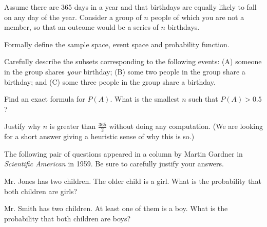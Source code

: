 \documentclass[a4paper,10pt,landscape,twocolumn]{scrartcl}
\begin{document}

\begin{exercise}[Birthdays]
  Assume there are 365 days in a year and that birthdays are equally likely to
  fall on any day of the year. Consider a group of $n$ people of which you are
  not a member, so that an outcome would be a series of $n$ birthdays.
  
  \begin{subex}
    Formally define the sample space, event space and probability function.
  \end{subex}
  
  \begin{subex}
    Carefully describe the subsets corresponding to the following events: (A)
    someone in the group shares \emph{your} birthday; (B) some two people in
    the group share a birthday; and (C) some three people in the group share a
    birthday.
  \end{subex}
  
  \begin{subex}
    Find an exact formula for $P(A)$. What is the smallest $n$ such that 
    $P(A) > 0.5$?
  \end{subex}
  
  \begin{subex}
    Justify why $n$ is greater than $\frac{3	65}{2}$ without doing any
    computation. (We are looking for a short answer giving a heuristic sense of
    why this is so.)
  \end{subex}
\end{exercise}


\begin{exercise}
  The following pair of questions appeared in a column by Martin Gardner in
  \emph{Scientific American} in 1959. Be sure to carefully justify your
  answers.
  
  \begin{subex}
    Mr. Jones has two children. The older child is a girl. What is the
    probability that both children are girls?
  \end{subex}
  
  \begin{subex}
    Mr. Smith has two children. At least one of them is a boy. What is the
    probability that both children are boys?
  \end{subex}
\end{exercise}
\end{document}
